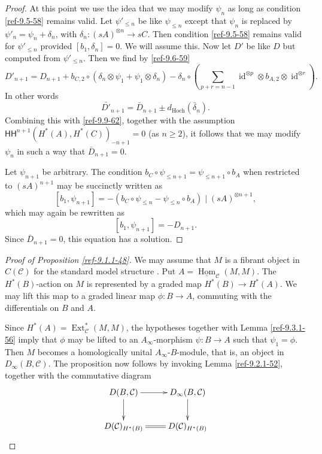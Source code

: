 \documentclass{amsart}
\numberwithin{equation}{section}
\let\cal\mathcal
\theoremstyle{definition}
\theoremstyle{remark}
\begin{document}
\begin{proof}
At this point we use the idea that we may modify $\psi_n$ as long as condition \eqref{ref-9.5-58}
remains valid. Let $\psi'_{\le n}$ be like $\psi_{\le n}$ except that $\psi_{n}$ is replaced by $\psi'_n=\psi_n+\delta_n$, with $\delta_n:(sA)^{\otimes n}\to sC$. Then condition \eqref{ref-9.5-58} remains valid for $\psi'_{\le n}$ provided $[b_1,\delta_n]=0$. We
will assume this.
Now let $D'$ be like $D$ but computed from $\psi'_{\le n}$. Then we find by \eqref{ref-9.6-59}
\[
D'_{n+1}=D_{n+1}+b_{C,2}\circ (\delta_n\otimes \psi_1+\psi_1\otimes \delta_n)-\delta_n\circ (\sum_{p+r=n-1} {\operatorname{id}}^{\otimes p}\otimes b_{A,2}\otimes {\operatorname{id}}^{\otimes r}).
\]
In other words
\[
\bar{D'}_{n+1}=\bar{D}_{n+1}\pm d_{\text{Hoch}}(\bar{\delta}_n).
\]
Combining this with  \eqref{ref-9.9-62}, together with the assumption ${\mathsf{HH}}^{n+1}(H^\ast(A),H^\ast(C))_{-n+1}=0$ (as $n\ge 2$), it
follows that we may modify $\psi_{n}$ in such a way that $\bar{D}_{n+1}=0$.

\medskip

Let $\psi_{n+1}$ be arbitrary. The condition $b_C\circ \psi_{\le n+1}=\psi_{\le n+1} \circ b_A$ when restricted
to $(sA)^{n+1}$ may be succinctly written as
\begin{equation}
\label{ref-9.10-63}
[b_1,\psi_{n+1}]=-(b_C \circ \psi_{\le n}-\psi_{\le n} \circ b_A)\mid (sA)^{\otimes n+1},
\end{equation}
which may again be rewritten as
\[
[b_1,\psi_{n+1}]=-D_{n+1}.
\]
Since $\bar{D}_{n+1}=0$, this equation has a solution.
\end{proof}
\begin{proof}[Proof of Proposition \ref{ref-9.1.1-48}]
We may assume that $M$ is a fibrant object in $C({{\cal C}})$ for the standard model structure \cite{Beke}. Put $A=\underline{\operatorname {Hom}}_{{\cal C}}(M,M)$.
The $H^\ast(B)$-action on $M$ is represented by a graded map $H^\ast(B){\rightarrow} H^\ast(A)$. We
may lift this map to a graded linear map $\phi:B{\rightarrow} A$, commuting with the differentials on $B$ and $A$.

Since $H^\ast(A)={\operatorname {Ext}}^\ast_{{\cal C}}(M,M)$, the hypotheses together with Lemma \ref{ref-9.3.1-56}
imply that $\phi$ may be lifted to an $A_\infty$-morphism $\psi:B{\rightarrow} A$ such that $\psi_1=\phi$.
Then $M$ becomes a homologically unital $A_\infty$-$B$-module, that is, an object in $D_\infty(B,{{\cal C}})$.
The proposition now follows by invoking Lemma \ref{ref-9.2.1-52}, together with the commutative
diagram
\[
\xymatrix{
D(B,{{\cal C}})\ar[r]\ar[d]& D_\infty(B,{{\cal C}})\ar[d]\\
D({{\cal C}})_{H^\ast(B)}\ar@{=}[r] & D({{\cal C}})_{H^\ast(B)}
}
\]
\end{proof}
\end{document}

